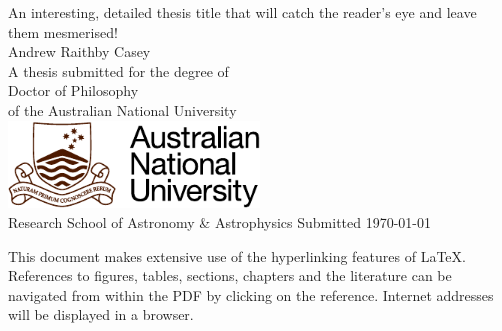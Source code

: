\documentclass[a4paper,11pt,openright]{report}
\newcommand{\thesistitle}{An interesting, detailed thesis title that will catch the reader's eye and leave them mesmerised!}
\newcommand{\fullname}{Andrew Raithby Casey}
\newcommand{\thesisdate}{\today}
\newcommand{\resubmissiondate}{\today}
\begin{document}
\setlength{\epigraphwidth}{10cm}
\setlength{\afterepigraphskip}{1.5cm}
\renewcommand{\epigraphsize}{\small}
\renewcommand{\epigraphrule}{0pt}
\renewcommand{\epigraphflush}{center}
\renewcommand{\textflush}{flushleft}


\pagestyle{empty}

%
%
%
%
\begin{titlepage}\selectfont
  \begin{center}
  \phantom{}
  \vspace{0cm}
    \huge{\thesistitle}
    \\[2.5cm]
    \huge{\fullname}
    \\[2.5cm]
    \LARGE{A thesis submitted for the degree of}\\[0.5cm]
      \LARGE{Doctor of Philosophy}\\[0.5cm]
      \LARGE{of the Australian National University}
    \\[3.cm]
     \includegraphics[width=0.5\textwidth]{anu-logo-colour}
     \\[10mm]
        \LARGE{Research School of Astronomy \& Astrophysics}
        \vfill
        \Large{Submitted \thesisdate}\\[1mm]
  \end{center}
\end{titlepage}

\setlength{\parindent}{0pt}
\setlength{\parskip}{1ex plus 0.5ex minus 0.2ex}


\setcounter{page}{0} 
\setlength\fboxsep{3mm}
\setlength\fboxrule{1pt}
\begin{center}
\end{center}
\vspace{5mm}
This document makes extensive use of the hyperlinking features of \LaTeX. References to figures, tables, sections, chapters and the literature can be navigated from within the PDF by clicking on the reference. Internet addresses will be displayed in a browser. 
\end{document}
